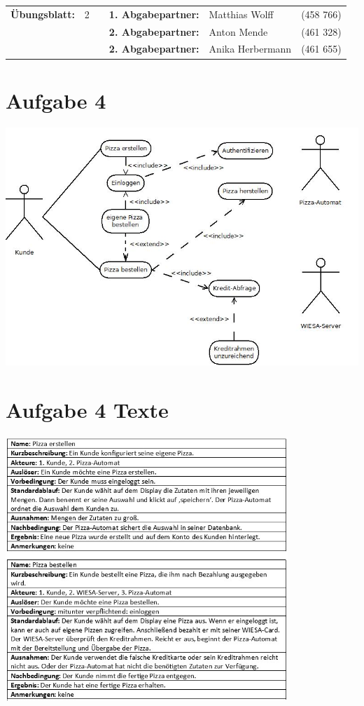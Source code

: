 \newcommand{\obenlinks}{Software Engineering}		%

\usepackage{float}


	\begin{center}
		\begin{tabular}{|rlp{4cm}rll|}
		\hline
		 \textbf{Übungsblatt:} & 2 &   & \textbf{1. Abgabepartner:} & Matthias Wolff & (458 766)  \\
		        & & & \textbf{2. Abgabepartner:} & Anton Mende & (461 328) \\
		        & & & \textbf{2. Abgabepartner:} & Anika Herbermann & (461 655) \\ \hline
		\end{tabular}
	\end{center}
\section*{Aufgabe 4}
\includegraphics[width=\textwidth,height=\textheight,keepaspectratio]{Aufgabe4.jpeg}
\pagebreak
\section*{Aufgabe 4 Texte}
\includegraphics[width=0.8\textwidth,height=\textheight,keepaspectratio]{Aufgabe4_Faelle.jpg}
